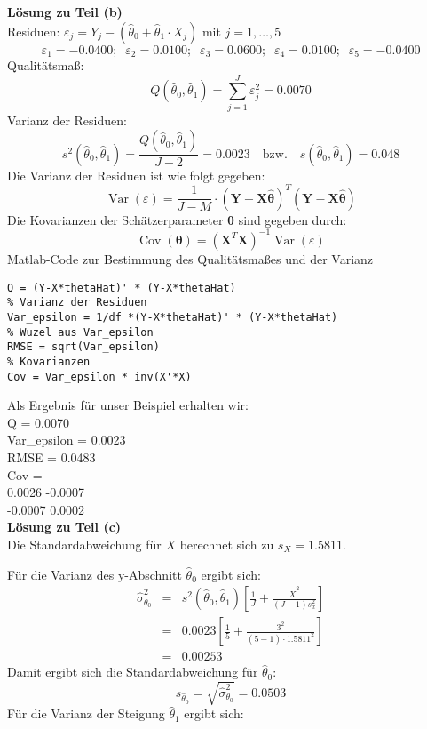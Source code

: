 \textbf{Lösung zu Teil (b)} \\
Residuen: $\varepsilon_j = Y_j -(\hat\theta _0 + \hat\theta _1 \cdot X_j)$
mit $j=1,\ldots ,5$
\[\varepsilon_1 = -0.0400; \;\; \varepsilon_2 =  0.0100;\;\;
\varepsilon_3= 0.0600;\;\; \varepsilon_4 =0.0100;\;\;
\varepsilon_5 = -0.0400
\]
Qualitätsmaß:
\[
Q(\hat\theta _0,\hat\theta _1) = \sum\limits_{j = 1}^J {\varepsilon_j ^2 }
= 0.0070
\]
Varianz der Residuen:
\[
s^2(\hat{\theta}_0 ,\hat{\theta}_1 ) = \frac{Q(\hat{\theta}_0 ,
	\hat{\theta}_1 )}{J - 2} = 0.0023 \quad \text{bzw.} \quad
s(\hat{\theta}_0 ,\hat{\theta}_1 ) = 0.048
\]
Die Varianz der Residuen ist wie folgt gegeben:
\begin{equation}
\operatorname{Var}(\varepsilon) = \frac{1}{J-M} \cdot \left(\mathbf Y - \mathbf X \hat{\boldsymbol\theta}\right)^T
\left(\mathbf Y - \mathbf X \hat{\boldsymbol\theta}\right)
\end{equation}
Die Kovarianzen der Schätzerparameter ${\boldsymbol\theta}$
sind gegeben durch:
\begin{equation}
\operatorname{Cov}(\boldsymbol\theta) = \left(\mathbf{X}^T \mathbf X \right)^{-1}
\operatorname{Var}(\varepsilon)
\end{equation}
Matlab-Code zur Bestimmung des Qualitätsmaßes und der Varianz
\begin{lstlisting}[style=Matlab]
% Qualitaetsmass Q
Q = (Y-X*thetaHat)' * (Y-X*thetaHat)
% Varianz der Residuen
Var_epsilon = 1/df *(Y-X*thetaHat)' * (Y-X*thetaHat)
% Wuzel aus Var_epsilon
RMSE = sqrt(Var_epsilon)
% Kovarianzen
Cov = Var_epsilon * inv(X'*X)
\end{lstlisting}
Als Ergebnis für unser Beispiel erhalten wir:\\
Q = 0.0070 \\
Var\_epsilon = 0.0023\\
RMSE = 0.0483 \\
Cov = \\
0.0026   -0.0007 \\
-0.0007    0.0002 \\

\textbf{Lösung zu Teil (c)} \\
Die Standardabweichung für $X$ berechnet sich zu $s_X = 1.5811$.

Für die Varianz des y-Abschnitt $\hat\theta_0$ ergibt sich:
\begin{eqnarray}
\hat\sigma_{\theta_0}^2 &=& s^2(\hat{\theta}_0 ,\hat{\theta}_1 )
\left[\frac{1}{J} + \frac{\bar{X}^2}{(J-1)s_x^2 } \right]
\nonumber \\
&=&
0.0023
\left[\frac{1}{5} + \frac{3^2}{(5-1)\cdot 1.5811^2 } \right]
\nonumber\\
&=& 0.00253 \nonumber
\end{eqnarray}
Damit ergibt sich die Standardabweichung für $\hat\theta_0$:
\[
s_{\hat\theta_0} = \sqrt{\hat\sigma_{\theta_0}^2} = 0.0503
\]
Für die Varianz der Steigung $\hat\theta_1$ ergibt sich:

